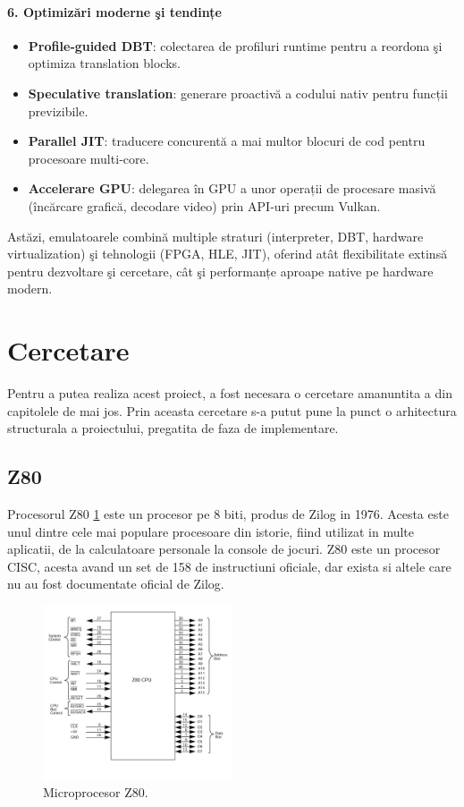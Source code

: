 \documentclass[titlepage,12pt]{article}
\begin{document}
\paragraph{6. Optimizări moderne şi tendințe}
\begin{itemize}
\item \textbf{Profile‑guided DBT}: colectarea de profiluri runtime pentru a reordona şi optimiza translation blocks.
\item \textbf{Speculative translation}: generare proactivă a codului nativ pentru funcții previzibile.
\item \textbf{Parallel JIT}: traducere concurentă a mai multor blocuri de cod pentru procesoare multi‑core.
\item \textbf{Accelerare GPU}: delegarea în GPU a unor operații de procesare masivă (încărcare grafică, decodare video) prin API‑uri precum Vulkan.
\end{itemize}

Astăzi, emulatoarele combină multiple straturi (interpreter, DBT, hardware virtualization) şi tehnologii (FPGA, HLE, JIT), oferind atât flexibilitate extinsă pentru dezvoltare şi cercetare, cât şi performanțe aproape native pe hardware modern.

\section{Cercetare}
Pentru a putea realiza acest proiect, a fost necesara o cercetare amanuntita a din capitolele de mai jos.
Prin aceasta cercetare s-a putut pune la punct o arhitectura structurala a proiectului, pregatita de faza de implementare.

\subsection{\ac {Z80}}
Procesorul Z80 \cref{fig:z80} este un procesor pe 8 biti, produs de Zilog in 1976. Acesta este unul dintre cele mai populare procesoare din istorie, fiind utilizat in multe aplicatii, de la calculatoare personale la console de jocuri.
\ac {Z80} este un procesor CISC, acesta avand un set de 158 de instructiuni oficiale, dar exista si altele care nu au fost documentate oficial de Zilog.

\begin{figure}[H]
\centering
\includegraphics[width=0.5\textwidth]{images/z80.jpg}
\caption{Microprocesor Z80.}
\label{fig:z80}
\end{figure}
\end{document}
